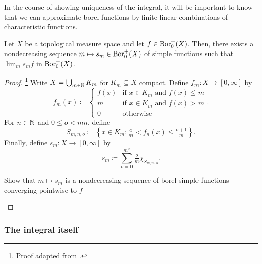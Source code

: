 In the course of showing uniqueness of the integral, it will be important to know that we can approximate borel functions by finite linear combinations of characteristic functions.
\begin{prp}\label{SimpleFunctionApproximation}
Let $X$ be a topological measure space and let $f\in \operatorname{Bor} _0^+(X)$.  Then, there exists a nondecreasing sequence $m\mapsto s_m\in \operatorname{Bor} _0^+(X)$ of simple functions such that $\lim _ms_mf$ in $\operatorname{Bor} _0^+(X)$.
\begin{proof}\footnote{Proof adapted from \cite[pg.~31]{Stein}.}
Write $X=\bigcup _{m\in \mathbb{N}}K_m$ for $K_m\subseteq X$ compact.  Define $f_m:X\rightarrow [0,\infty ]$ by
\begin{equation}
f_m(x)\coloneqq \begin{cases}f(x) & \text{if }x\in K_m\text{ and }f(x)\leq m \\ m & \text{if }x\in K_m\text{ and }f(x)>m \\ 0 & \text{otherwise}\end{cases}.
\end{equation}
For $n\in \mathbb{N}$ and $0\leq o<mn$, define
\begin{equation}
S_{m,n,o}\coloneqq \left\{ x\in K_m:\tfrac{o}{m}<f_n(x)\leq \tfrac{o+1}{m}\right\} .
\end{equation}
Finally, define $s_m:X\rightarrow [0,\infty ]$ by
\begin{equation}
s_m\coloneqq \sum _{o=0}^{m^2}\tfrac{o}{m}\chi _{S_{m,m,o}}.
\end{equation}
\begin{exr}
Show that $m\mapsto s_m$ is a nondecreasing sequence of borel simple functions converging pointwise to $f$
\end{exr}
\end{proof}
\end{prp}

\subsubsection{The integral itself}

